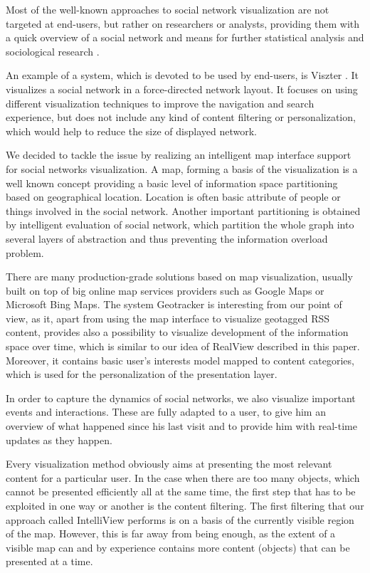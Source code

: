 \documentclass[6pt]{article}
\begin{document}
Most of the well-known approaches to social network visualization are not targeted at end-users, but rather on researchers or analysts, providing them with a quick overview of a social network and means for further statistical analysis and sociological research \cite{yang2008visual}.




An example of a system, which is devoted to be used by end-users, is Viszter \cite{heer2005vizster}. It visualizes a social network in a force-directed network layout. It focuses on using different visualization techniques to improve the navigation and search experience, but does not include any kind of content filtering or personalization, which would help to reduce the size of displayed network.

We decided to tackle the issue by realizing an intelligent map interface support for social networks visualization. A map, forming a basis of the visualization is a well known concept providing a basic level of information space partitioning based on geographical location. Location is often basic attribute of people or things involved in the social network. Another important partitioning is obtained by intelligent evaluation of social network, which partition the whole graph into several layers of abstraction and thus preventing the information overload problem.

There are many production-grade solutions based on map visualization, usually built on top of big online map services providers such as Google Maps or Microsoft Bing Maps. The system Geotracker \cite{chen2007geotracker} is interesting from our point of view, as it, apart from using the map interface to visualize geotagged RSS content, provides also a possibility to visualize development of the information space over time, which is similar to our idea of RealView described in this paper. Moreover, it contains basic user’s interests model mapped to content categories, which is used for the personalization of the presentation layer.

In order to capture the dynamics of social networks, we also visualize important events and interactions. These are fully adapted to a user, to give him an overview of what happened since his last visit and to provide him with real-time updates as they happen.

Every visualization method obviously aims at presenting the most relevant content for a particular user. In the case when there are too many objects, which cannot be presented efficiently all at the same time, the first step that has to be exploited in one way or another is the content filtering. The first filtering that our approach called IntelliView performs is on a basis of the currently visible region of the map. However, this is far away from being enough, as the extent of a visible map can and by experience contains more content (objects) that can be presented at a time.
\end{document}

